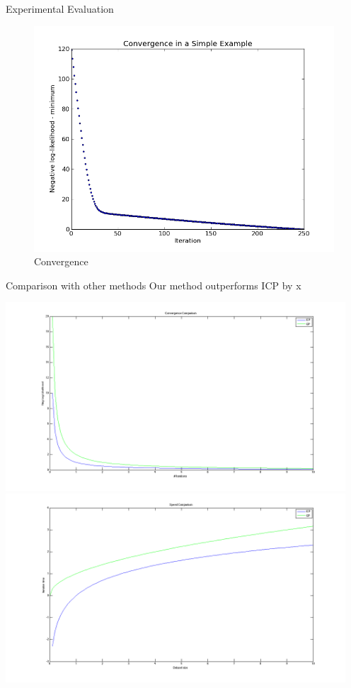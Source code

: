 \documentclass[final]{beamer}
\begin{document}
\begin{frame}{}
\begin{textblock}{27}
\begin{block}{Experimental Evaluation}
\begin{figure}
\includegraphics[width=8in]{likelihood.png}
\caption{Convergence}
\end{figure}
\end{block}


\begin{block}{Comparison with other methods}
Our method outperforms ICP by x%

\includegraphics[width=5in]{ConvergenceComparison.png}
\includegraphics[width=5in]{SpeedComparison.png}
\end{block}


\end{textblock}
\end{frame}
\end{document}
